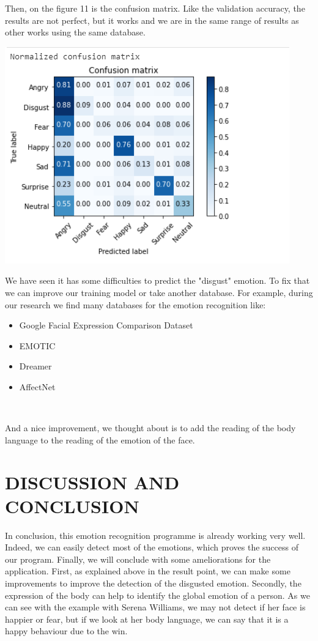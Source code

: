 \documentclass[a4paper, 10pt, conference]{ieeeconf}      %
\begin{document}
Then, on the figure 11 is the confusion matrix.
Like the validation accuracy, the results are not perfect, but it works and we are in the same range of results as other works using the same database.


\begin{center}
\includegraphics[scale=0.7]{Confusion_matrix}
\label{fig11}
\end{center}


We have seen it has some difficulties to predict the "disgust" emotion.
To fix that we can improve our training model or take another database.
For example, during our research we find many databases for the emotion recognition like:
\begin{itemize}
\item Google Facial Expression Comparison Dataset
\item EMOTIC
\item Dreamer
\item AffectNet
\end{itemize}
\

And a nice improvement, we thought about is to add the reading of the body language to the reading of the emotion of the face.


\section{DISCUSSION AND CONCLUSION}
In conclusion, this emotion recognition programme is already working very well.
Indeed, we can easily detect most of the emotions, which proves the success of our program. 
Finally, we will conclude with some ameliorations for the application.
First, as explained above in the result point, we can make some improvements to improve the detection of the disgusted emotion.
Secondly, the expression of the body can help to identify the global emotion of a person.
As we can see with the example with Serena Williams, we may not detect if her face is happier or fear, but if we look at her body language, we can say that it is a happy behaviour due to the win.
\end{document}

